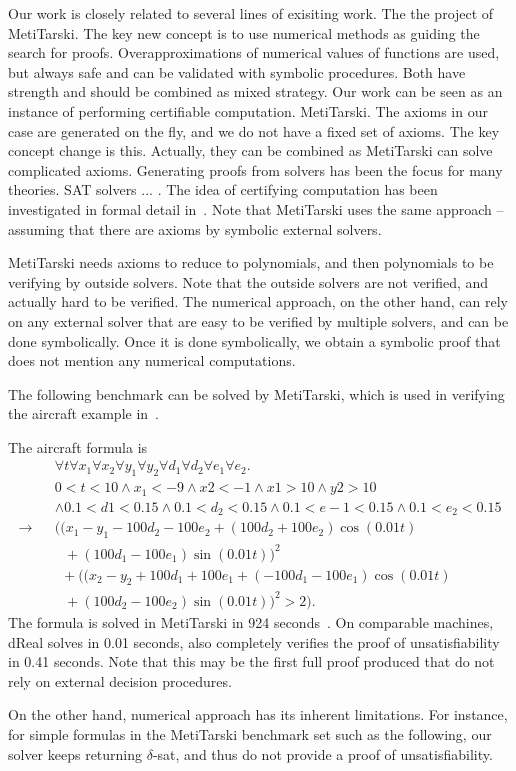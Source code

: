 \documentclass[envcountsect]{llncs}
\begin{document}
Our work is closely related to several lines of exisiting work. The the
project of MetiTarski. The key new concept is to use numerical methods as
guiding the search for proofs. Overapproximations of numerical values of
functions are used, but always safe and can be validated with symbolic
procedures. Both have strength and should be combined as mixed strategy. Our
work can be seen as an instance of performing certifiable computation.
MetiTarski. The axioms in our case are generated on the fly, and we do not have
a fixed set of axioms. The key concept change is this. Actually, they can be
combined as MetiTarski can solve
complicated axioms. 
Generating proofs from solvers has been the focus for
many theories. SAT solvers ... . The idea of certifying computation has been
investigated in formal detail in~\cite{}. Note that MetiTarski uses the same
approach -- assuming that there are axioms by symbolic external solvers. 

MetiTarski needs axioms to reduce to polynomials, and then polynomials to be
verifying by outside solvers. Note that the outside solvers are not verified,
and actually hard to be verified. The numerical approach, on the other hand,
can rely on any external solver that are easy to be verified by multiple
solvers, and can be done symbolically. Once it is done symbolically, we obtain
a symbolic proof that does not mention any numerical computations. 

The following benchmark can be solved by MetiTarski, which is used in verifying
the aircraft example in~\cite{}. 
\begin{example}[Aircraft]
The aircraft formula is
\begin{eqnarray*}
& &\forall t \forall x_1\forall x_2 \forall y_1\forall y_2\forall
d_1\forall d_2\forall e_1\forall e_2. \\
& &0<t<10\wedge x_1<-9 \wedge x2<-1\wedge
x1>10 \wedge y2>10\\
& & \wedge 0.1<d1< 0.15\wedge 0.1<d_2<0.15 \wedge
0.1<e-1<0.15\wedge 0.1<e_2<0.15 \\
\rightarrow & &\Big(
\Big(x_1-y_1-100d_2-100e_2+(100d_2+100e_2)\cos(0.01t)\\
& &\ \ \ + (100d_1
-100e_1)\sin(0.01t)\Big)^2\\
& & \ \ +\Big((x_2-y_2+100d_1+100e_1+(-100d_1-100e_1)\cos(0.
0 1 t ) \\
& &\ \ \  + (100d_2 - 100e_2)\sin(0.01t)\Big)^2 > 2\Big).
\end{eqnarray*}
The formula is solved in MetiTarski in 924
seconds~\cite{}. On comparable machines, dReal solves in 0.01 seconds, also
completely verifies the proof of unsatisfiability in 0.41 seconds. Note that
this may be the first full proof produced that do not rely on external decision
procedures. 
\end{example}
On the other hand, numerical approach has its inherent limitations. For
instance, for simple formulas in the MetiTarski benchmark set such as the
following, our solver keeps returning $\delta$-sat, and thus do not provide a
proof of unsatisfiability. 
\begin{example}
 
\end{example}
\end{document}

